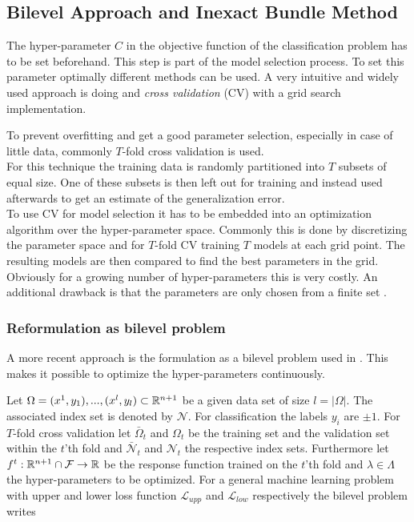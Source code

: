 \subsection{Bilevel Approach and Inexact Bundle Method}

The hyper-parameter \(C\) in the objective function of the classification problem has to be set beforehand. This step is part of the model selection process.
To set this parameter optimally different methods can be used.
A very intuitive and widely used approach is doing  and \emph{cross validation} (CV) with a grid search implementation.

To prevent overfitting and get a good parameter selection, especially in case of little data, commonly \(T\)-fold cross validation is used. \\
For this technique the training data is randomly partitioned into \(T\) subsets of equal size. One of these subsets is then left out for training and instead used afterwards to get an estimate of the generalization error.  \\
To use CV for model selection it has to be embedded into an optimization algorithm over the hyper-parameter space. 
Commonly this is done by discretizing the parameter space and for \(T\)-fold CV training \(T\) models at each grid point. The resulting models are then compared to find the best parameters in the grid.
Obviously for a growing number of hyper-parameters this is very costly. An additional drawback is that the parameters are only chosen from a finite set \cite{Kunapuli2008}.

\subsubsection{Reformulation as bilevel problem}

A more recent approach is the formulation as a bilevel problem used in \cite{Kunapuli2008, Moore2011}.
This makes it possible to optimize the hyper-parameters continuously.


Let \(\Omega = {(x^1,y_1),...,(x^l,y_l)} \subset \mathbb{R}^{n+1}\) be a given data set of size \(l = |\Omega|\). The associated index set is denoted by \(\mathcal{N}\). For classification the labels \(y_i\) are \(\pm1\).
For \(T\)-fold cross validation let \(\bar{\Omega}_t\) and \(\Omega_t\) be the training set and the validation set within the \(t\)'th fold and \(\bar{\mathcal{N}}_t\) and \(\mathcal{N}_t\) the respective index sets.
Furthermore let \(f^t:\mathbb{R}^{n+1}\cap\mathcal{F} \to \mathbb{R}\) be the response function trained on the \(t\)'th fold and \(\lambda \in \Lambda\) the hyper-parameters to be optimized.
For a general machine learning problem with upper and lower loss function \(\mathcal{L}_{upp}\) and \(\mathcal{L}_{low}\) respectively the bilevel problem writes
 
